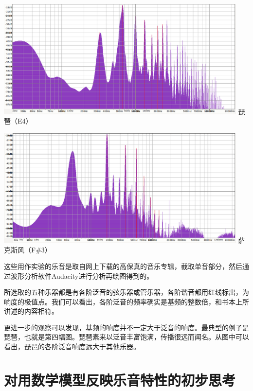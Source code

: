 \begin{center}
    \includegraphics[height=6cm]{lute(E4).jpg}
    \vspace{3mm}
    琵琶（E4）
    \vspace{2cm}
\end{center}
\begin{center}
    \includegraphics[height=6cm]{saxophone(F3sharp).jpg}
    \vspace{3mm}
    萨克斯风（F\#3）
\end{center}
\par
这些用作实验的乐音是取自网上下载的高保真的音乐专辑，截取单音部分，然后通过波形分析软件Audacity进行分析再绘图得到的。
\par
所选取的五种乐器都是有各阶泛音的弦乐器或管乐器，各阶谐音都用红线标出，为响度的极值点。我们可以看出，各阶泛音的频率确实是基频的整数倍，和书本上所讲述的内容相符。
\par
更进一步的观察可以发现，基频的响度并不一定大于泛音的响度。最典型的例子是琵琶，也就是第四幅图。琵琶素来以泛音丰富饱满，传播很远而闻名。从图中可以看出，琵琶的各阶泛音响度远大于其他乐器。
\section{对用数学模型反映乐音特性的初步思考}
